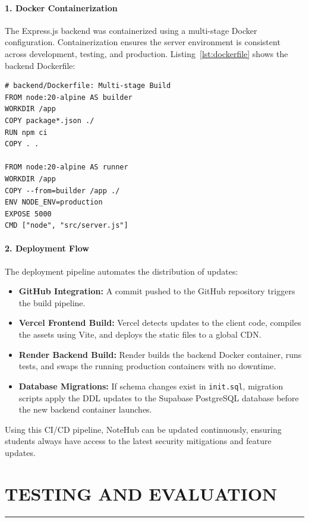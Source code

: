 \documentclass[12,Times new Roman,a4paper]{report}
\begin{document}
\subsubsection*{1. Docker Containerization}
The Express.js backend was containerized using a multi-stage Docker configuration. Containerization ensures the server environment is consistent across development, testing, and production. Listing~\ref{lst:dockerfile} shows the backend Dockerfile:

\begin{verbatim}
# backend/Dockerfile: Multi-stage Build
FROM node:20-alpine AS builder
WORKDIR /app
COPY package*.json ./
RUN npm ci
COPY . .

FROM node:20-alpine AS runner
WORKDIR /app
COPY --from=builder /app ./
ENV NODE_ENV=production
EXPOSE 5000
CMD ["node", "src/server.js"]
\end{verbatim}
\label{lst:dockerfile}

\subsubsection*{2. Deployment Flow}
The deployment pipeline automates the distribution of updates:
\begin{itemize}
    \item \textbf{GitHub Integration:} A commit pushed to the GitHub repository triggers the build pipeline.
    \item \textbf{Vercel Frontend Build:} Vercel detects updates to the client code, compiles the assets using Vite, and deploys the static files to a global CDN.
    \item \textbf{Render Backend Build:} Render builds the backend Docker container, runs tests, and swaps the running production containers with no downtime.
    \item \textbf{Database Migrations:} If schema changes exist in \texttt{init.sql}, migration scripts apply the DDL updates to the Supabase PostgreSQL database before the new backend container launches.
\end{itemize}

Using this CI/CD pipeline, NoteHub can be updated continuously, ensuring students always have access to the latest security mitigations and feature updates.

\newpage
\chapter{TESTING AND EVALUATION}
 \rule{\textwidth}{1pt}
\end{document}

